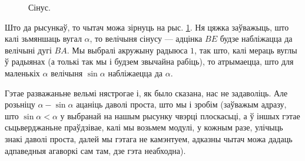 \documentclass[10pt,a4paper]{book}
\theoremstyle{plain}
\begin{document}
\begin{figure}
  \centering
  \caption{Сінус.}
  \label{fig:sine}
\end{figure}

Што да рысункаў, то чытач можа зірнуць на рыс. \ref{fig:sine}. Ня цяжка
заўважыць, што калі зьмяншаць вугал $\alpha$, то велічыня сінусу --- адцінка
$BE$ будзе набліжацца да велічыні дугі $BA$. Мы выбралі акружыну радыюса $1$,
так што, калі мераць вуглы ў радыянах (а толькі так мы і будзем звычайна
рабіць), то атрымаецца, што для маленькіх $\alpha$ велічыня $\sin \alpha$
набліжаецца да $\alpha$.

Гэтае разважаньне вельмі нястрогае і, як было сказана, нас не задаволіць. Але
розьніцу $\alpha - \sin \alpha$ ацаніць даволі проста, што мы і зробім (заўважым
адразу, што $\sin \alpha < \alpha$ у выбранай на нашым рысунку чвэрці
плоскасьці, а ў іншых гэтае сьцьверджаньне праўдзівае, калі мы возьмем модулі, у
кожным разе, улічыць знакі даволі проста, далей мы гэтага не камэнтуем, адказны
чытач можа дадаць адпаведныя агаворкі сам там, дзе гэта неабходна).
\end{document}
